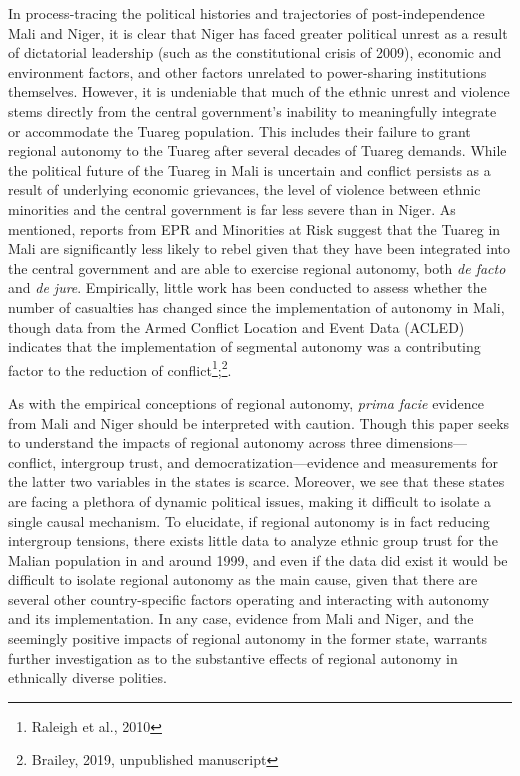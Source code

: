 \documentclass[12pt]{article}
\begin{document}
In process-tracing the political histories and trajectories of post-independence Mali and Niger, it is clear that Niger has faced greater political unrest as a result of dictatorial leadership (such as the constitutional crisis of 2009), economic and environment factors, and other factors unrelated to power-sharing institutions themselves. However, it is undeniable that much of the ethnic unrest and violence stems directly from the central government's inability to meaningfully integrate or accommodate the Tuareg population. This includes their failure to grant regional autonomy to the Tuareg after several decades of Tuareg demands. While the political future of the Tuareg in Mali is uncertain and conflict persists as a result of underlying economic grievances, the level of violence between ethnic minorities and the central government is far less severe than in Niger. As mentioned, reports from EPR and Minorities at Risk suggest that the Tuareg in Mali are significantly less likely to rebel given that they have been integrated into the central government and are able to exercise regional autonomy, both \textit{de facto} and \textit{de jure}. Empirically, little work has been conducted to assess whether the number of casualties has changed since the implementation of autonomy in Mali, though data from the Armed Conflict Location and Event Data (ACLED) indicates that the implementation of segmental autonomy was a contributing factor to the reduction of conflict\footnote{Raleigh et al., 2010};\footnote{Brailey, 2019, unpublished manuscript}.

As with the empirical conceptions of regional autonomy, \textit{prima facie} evidence from Mali and Niger should be interpreted with caution. Though this paper seeks to understand the impacts of regional autonomy across three dimensions---conflict, intergroup trust, and democratization---evidence and measurements for the latter two variables in the states is scarce. Moreover, we see that these states are facing a plethora of dynamic political issues, making it difficult to isolate a single causal mechanism. To elucidate, if regional autonomy is in fact reducing intergroup tensions, there exists little data to analyze ethnic group trust for the Malian population in and around 1999, and even if the data did exist it would be difficult to isolate regional autonomy as the main cause, given that there are several other country-specific factors operating and interacting with autonomy and its implementation. In any case, evidence from Mali and Niger, and the seemingly positive impacts of regional autonomy in the former state, warrants further investigation as to the substantive effects of regional autonomy in ethnically diverse polities. 
\end{document}

